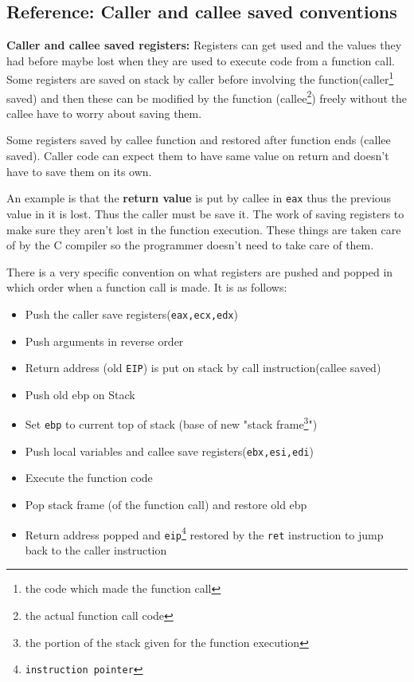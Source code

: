 \documentclass[12pt]{article}
\begin{document}
\subsection*{Reference: Caller and callee saved conventions}
\textbf{Caller and callee saved registers:} Registers can get used and the values they had before maybe lost
when they are used to execute code from a function call. Some registers are saved on stack by caller before involving the function(caller\footnote{the code which made the function call} saved)
and then these can be modified by the function (callee\footnote{the actual function call code}) freely without the callee have to worry about saving them.

Some registers saved by callee function and restored after function ends (callee saved). Caller code
can expect them to have same value on return and doesn't have to save them on its own. 

An example is that the \textbf{return value} is put by callee in \texttt{eax} thus the previous value in it is lost. Thus the caller must be save it. The 
work of saving registers to make sure they aren't lost in the function execution.
These things are taken care of by the C compiler so the programmer doesn't need to take care of them. 


There is a very specific convention on what registers are pushed and popped in which order when a function call is made.
It is as follows:
\begin{itemize}[topsep=0pt, partopsep=0pt, itemsep=0pt, parsep=0pt]
    \item Push the caller save registers(\texttt{eax,ecx,edx})
    \item Push arguments in reverse order
    \item Return address (old \texttt{EIP}) is put on stack by call instruction(callee saved)
    \item Push old ebp on Stack
    \item Set \texttt{ebp} to current top of stack (base of new "stack frame\footnote{the portion of the stack given for the function execution}")
    \item Push local variables and callee save registers(\texttt{ebx,esi,edi})
    \item Execute the function code
    \item Pop stack frame (of the function call) and restore old ebp 
    \item Return address popped and \texttt{eip\footnote{instruction pointer}} restored by the \texttt{ret} instruction to jump back to the caller instruction

\end{itemize}
\end{document}

